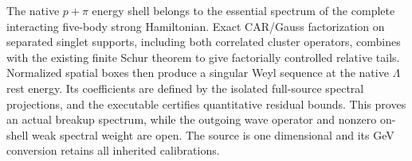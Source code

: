 The native $p+\pi$ energy shell belongs to the essential spectrum
of the complete interacting five-body strong Hamiltonian. Exact CAR/Gauss
factorization on separated singlet supports, including both correlated
cluster operators, combines with the existing finite Schur theorem to give
factorially controlled relative tails. Normalized spatial boxes then produce
a singular Weyl sequence at the native $\Lambda$ rest energy. Its coefficients
are defined by the isolated full-source spectral projections, and the
executable certifies quantitative residual bounds. This proves an actual
breakup spectrum, while the outgoing wave operator and nonzero on-shell weak
spectral weight are open. The source is one dimensional and its GeV
conversion retains all inherited calibrations.
